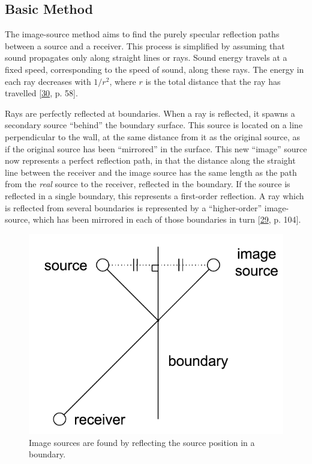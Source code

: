 \documentclass[]{scrreprt}
\begin{document}
\hypertarget{basic-method}{\subsection{Basic
Method}\label{basic-method}}

The image-source method aims to find the purely specular reflection
paths between a source and a receiver. This process is simplified by
assuming that sound propagates only along straight lines or rays. Sound
energy travels at a fixed speed, corresponding to the speed of sound,
along these rays. The energy in each ray decreases with \(1/r^2\), where
\(r\) is the total distance that the ray has travelled
{[}\protect\hyperlink{ref-vorlanderux5fauralization:ux5f2007}{30}, p.
58{]}.

Rays are perfectly reflected at boundaries. When a ray is reflected, it
spawns a secondary source ``behind'' the boundary surface. This source
is located on a line perpendicular to the wall, at the same distance
from it as the original source, as if the original source has been
``mirrored'' in the surface. This new ``image'' source now represents a
perfect reflection path, in that the distance along the straight line
between the receiver and the image source has the same length as the
path from the \emph{real} source to the receiver, reflected in the
boundary. If the source is reflected in a single boundary, this
represents a first-order reflection. A ray which is reflected from
several boundaries is represented by a ``higher-order'' image-source,
which has been mirrored in each of those boundaries in turn
{[}\protect\hyperlink{ref-kuttruffux5froomux5f2009}{29}, p. 104{]}.

\begin{figure}[htbp]
\centering
\includegraphics{images/image_source_construction.pdf}
\caption{Image sources are found by reflecting the source position in a
boundary.\label{fig:image_source_construction}}
\end{figure}
\end{document}
